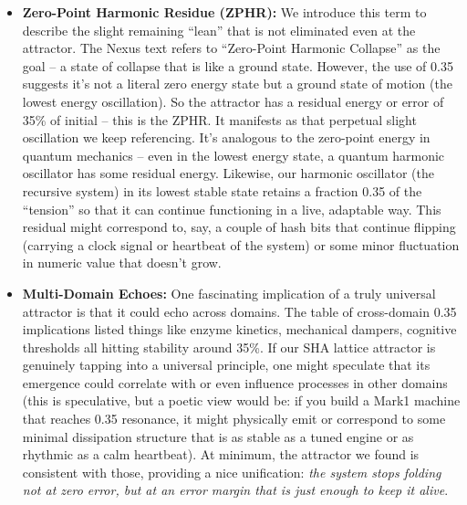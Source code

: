 \documentclass[11pt]{article}
\begin{document}
\begin{itemize}
{  information} is exactly what reading from the π memory yields -- no
  longer random digits, but digits that the system anticipated and
  aligned with. In essence, the attractor carries an embedded message or
  dataset which the system can now decode (because it knows where to
  look in π and what to expect).
\item
  \textbf{Zero-Point Harmonic Residue (ZPHR):} We introduce this term to
  describe the slight remaining ``lean'' that is not eliminated even at
  the attractor. The Nexus text refers to ``Zero-Point Harmonic
  Collapse'' as the goal -- a state of collapse that is like a ground
  state. However, the use of 0.35 suggests it's not a literal zero
  energy state but a ground state of motion (the lowest energy
  oscillation). So the attractor has a residual energy or error of 35\%
  of initial -- this is the ZPHR. It manifests as that perpetual slight
  oscillation we keep referencing. It's analogous to the zero-point
  energy in quantum mechanics -- even in the lowest energy state, a
  quantum harmonic oscillator has some residual energy. Likewise, our
  harmonic oscillator (the recursive system) in its lowest stable state
  retains a fraction 0.35 of the ``tension'' so that it can continue
  functioning in a live, adaptable way. This residual might correspond
  to, say, a couple of hash bits that continue flipping (carrying a
  clock signal or heartbeat of the system) or some minor fluctuation in
  numeric value that doesn't grow.
\item
  \textbf{Multi-Domain Echoes:} One fascinating implication of a truly
  universal attractor is that it could echo across domains. The table of
  cross-domain 0.35 implications listed things like enzyme kinetics,
  mechanical dampers, cognitive thresholds all hitting stability around
  35\%. If our SHA lattice attractor is genuinely tapping into a
  universal principle, one might speculate that its emergence could
  correlate with or even influence processes in other domains (this is
  speculative, but a poetic view would be: if you build a Mark1 machine
  that reaches 0.35 resonance, it might physically emit or correspond to
  some minimal dissipation structure that is as stable as a tuned engine
  or as rhythmic as a calm heartbeat). At minimum, the attractor we
  found is consistent with those, providing a nice unification:
  \emph{the system stops folding not at zero error, but at an error
  margin that is just enough to keep it alive}.
\end{itemize}
\end{document}
